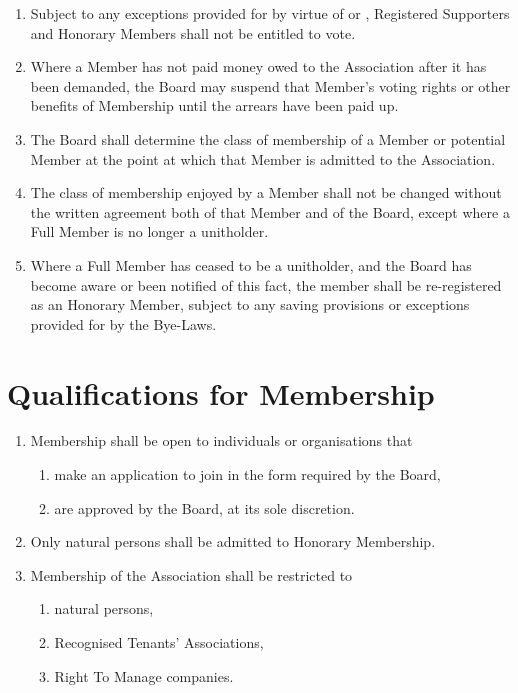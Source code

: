 \documentclass[10pt]{mk-articles-of-association}
\newcommand{\mysection}[1]{
  \end{enumerate}
  \section*{#1}
  \begin{enumerate}[resume]
}
\newcommand{\EC}[0]{Board}
\newcommand{\Exec}[0]{\EC{} }
\newcommand{\RTA}[0]{Recognised Tenants' Association}
\begin{document}
\begin{enumerate}
  \item Subject to any exceptions provided for by virtue of
     or ,
    Registered Supporters and
    Honorary Members shall not be entitled to vote.

  \item Where a Member has not paid money owed to the Association after
    it has been demanded, the Board may suspend that Member's voting
    rights or other benefits of Membership until the arrears have been
    paid up.

  \item The \Exec shall determine the class of membership of a Member
    or potential Member at the point at which that Member is admitted
    to the Association.

  \item The class of membership enjoyed by a Member
    shall not be changed without the written agreement both of that
    Member and of the \EC{}, except where a Full Member is no
    longer a unitholder.

  \item Where a Full Member has ceased to be a unitholder, and the
    \Exec has become aware or been notified of this fact, the member
    shall be re-registered as an Honorary Member, subject to any
    saving provisions or exceptions provided for by the Bye-Laws.


\mysection{Qualifications for Membership}

  \item Membership shall be open to individuals or organisations that
    \begin{enumerate}
      \item make an application to join in the form required by the \EC, \ITand
      \item are approved by the \EC{}, at its sole discretion.
    \end{enumerate}

  \item Only natural persons shall be admitted to Honorary Membership.

  \item Membership of the Association shall be restricted to
    \begin{enumerate}
    \item natural persons,
    \item \RTA{}s, \ITand
    \item Right To Manage companies.
    \end{enumerate}


\end{enumerate}
\end{document}
